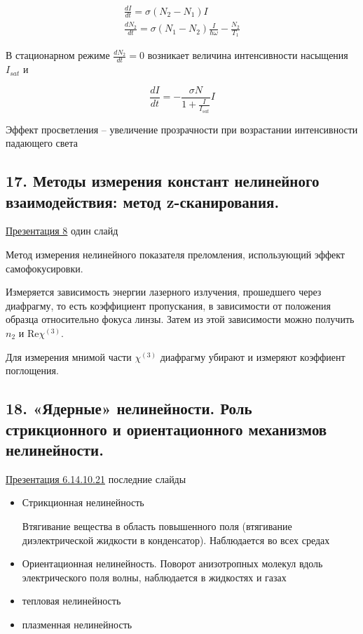 \documentclass[11 pt]{article}
\begin{document}
    \begin{align}
        \frac{d I}{d t} = \sigma (N_2 - N_1) I \\
        \frac{d N_2}{d t } = \sigma (N_1 - N_2) \frac{I}{\hbar \omega} - \frac{N_2}{T_1}
    \end{align}

    В стационарном режиме $\frac{d N_2}{d t } = 0$ возникает величина интенсивности насыщения $I_{sat}$ и

    \begin{equation}
        \frac{d I }{d t} = - \frac{\sigma N}{1 + \frac{I}{I_{sat}}} I
    \end{equation}

    Эффект просветления -- увеличение прозрачности при возрастании интенсивности падающего света

    \subsection*{17. Методы измерения констант нелинейного взаимодействия: метод z-сканирования.}

    \href{https://docs.google.com/presentation/d/1EXS66mVOTrJ9DTWXtli-Kh3TE5-qSYC4/edit#slide=id.p20}{Презентация 8} один слайд

    Метод измерения нелинейного показателя преломления, использующий эффект самофокусировки.

    Измеряется зависимость энергии лазерного излучения, прошедшего через диафрагму, то есть коэффициент пропускания, в зависимости от положения образца относительно фокуса линзы. Затем из этой зависимости можно получить $n_2$ и Re$\chi^{(3)}$.

    Для измерения мнимой части $\chi^{(3)}$ диафрагму убирают и измеряют коэффиент поглощения.

    \subsection*{18. «Ядерные» нелинейности. Роль стрикционного и ориентационного механизмов нелинейности.}

    \href{https://docs.google.com/presentation/d/1K_ZGFk-pBl2Iq715U5IDb6fHsFmTuww9/edit#slide=id.p16}{Презентация 6.14.10.21} последние слайды

    \begin{itemize}
        \item Стрикционная нелинейность

        Втягивание вещества в область повышенного поля (втягивание диэлектрической жидкости в конденсатор). Наблюдается во всех средах

        \item Ориентационная нелинейность. Поворот анизотропных молекул вдоль электрического поля волны, наблюдается в жидкостях и газах

        \item тепловая нелинейность

        \item плазменная нелинейность

    \end{itemize}
\end{document}
